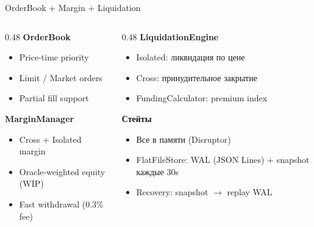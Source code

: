\documentclass[aspectratio=169]{beamer}
\begin{document}
\begin{frame}{OrderBook + Margin + Liquidation}

\begin{columns}[t]
\begin{column}{0.48\textwidth}
\textbf{OrderBook}
\begin{itemize}
    \item Price-time priority
    \item Limit / Market orders
    \item Partial fill support
\end{itemize}
\textbf{MarginManager}
\begin{itemize}
    \item Cross + Isolated margin
    \item Oracle-weighted equity (WIP)
    \item Fast withdrawal (0.3\% fee)
\end{itemize}
\end{column}
\begin{column}{0.48\textwidth}
\textbf{LiquidationEngine}
\begin{itemize}
    \item Isolated: ликвидация по цене
    \item Cross: принудительное закрытие
    \item FundingCalculator: premium index
\end{itemize}
\textbf{Стейты}
\begin{itemize}
    \item Все в памяти (Disruptor)
    \item FlatFileStore: WAL (JSON Lines) + snapshot каждые 30s
    \item Recovery: snapshot $\to$ replay WAL
\end{itemize}
\end{column}
\end{columns}
\end{frame}
\end{document}
